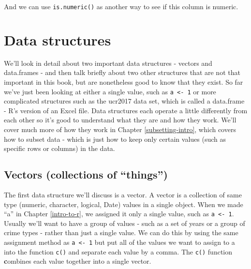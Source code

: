 \documentclass[
]{krantz}
\makeatletter
\newenvironment{Shaded}{\begin{snugshade}}{\end{snugshade}}
\newcommand{\CommentTok}[1]{\textcolor[rgb]{0.37,0.37,0.37}{\textit{#1}}}
\newcommand{\FunctionTok}[1]{\textcolor[rgb]{0,0,0}{#1}}
\newcommand{\NormalTok}[1]{#1}
\newcommand{\SpecialCharTok}[1]{\textcolor[rgb]{0,0,0}{#1}}
\newenvironment{kframe}{%
\medskip{}
\setlength{\fboxsep}{.8em}
 \def\at@end@of@kframe{}%
 \ifinner\ifhmode%
  \def\at@end@of@kframe{\end{minipage}}%
  \begin{minipage}{\columnwidth}%
 \fi\fi%
 \def\FrameCommand##1{\hskip\@totalleftmargin \hskip-\fboxsep
 \colorbox{shadecolor}{##1}\hskip-\fboxsep
     \hskip-\linewidth \hskip-\@totalleftmargin \hskip\columnwidth}%
 \MakeFramed {\advance\hsize-\width
   \@totalleftmargin\z@ \linewidth\hsize
   \@setminipage}}%
 {\par\unskip\endMakeFramed%
 \at@end@of@kframe}
\renewenvironment{Shaded}{\begin{kframe}}{\end{kframe}}
\makeatother
\begin{document}
\begin{Shaded}
\end{Shaded}

And we can use \texttt{is.numeric()} as another way to see
if this column is numeric.

\begin{Shaded}
\end{Shaded}

\hypertarget{data-structures}{%
\section{Data structures}\label{data-structures}}

We'll look in detail about two important data structures -
vectors and data.frames - and then talk briefly about two
other structures that are not that important in this book,
but are nonetheless good to know that they exist. So far
we've just been looking at either a single value, such as
\texttt{a\ \textless{}-\ 1} or more complicated structures
such as the ucr2017 data set, which is called a data.frame -
R's version of an Excel file. Data structures each operate a
little differently from each other so it's good to
understand what they are and how they work. We'll cover much
more of how they work in Chapter \ref{subsetting-intro},
which covers how to subset data - which is just how to keep
only certain values (such as specific rows or columns) in
the data.

\hypertarget{vectors}{%
\subsection{Vectors (collections of
``things'')}\label{vectors}}

The first data structure we'll discuss is a vector. A vector
is a collection of same type (numeric, character, logical,
Date) values in a single object. When we made ``a'' in
Chapter \ref{intro-to-r}, we assigned it only a single
value, such as \texttt{a\ \textless{}-\ 1}. Usually we'll
want to have a group of values - such as a set of years or a
group of crime types - rather than just a single value. We
can do this by using the same assignment method as
\texttt{a\ \textless{}-\ 1} but put all of the values we
want to assign to a into the function \texttt{c()} and
separate each value by a comma. The \texttt{c()} function
\textbf{c}ombines each value together into a single vector.
\end{document}
